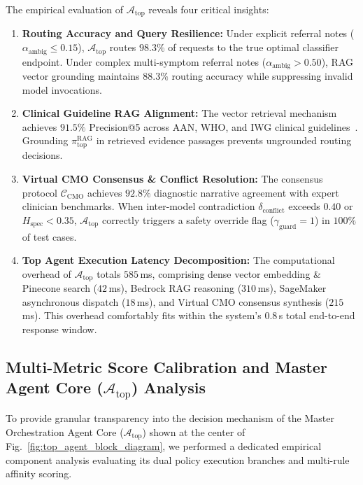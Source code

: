 \documentclass[runningheads]{llncs}
\begin{document}
The empirical evaluation of $\mathcal{A}_{\text{top}}$ reveals four critical insights:
\begin{enumerate}
    \item \textbf{Routing Accuracy and Query Resilience:} Under explicit referral notes ($\alpha_{\text{ambig}} \le 0.15$), $\mathcal{A}_{\text{top}}$ routes $98.3\%$ of requests to the true optimal classifier endpoint. Under complex multi-symptom referral notes ($\alpha_{\text{ambig}} > 0.50$), RAG vector grounding maintains $88.3\%$ routing accuracy while suppressing invalid model invocations.
    \item \textbf{Clinical Guideline RAG Alignment:} The vector retrieval mechanism achieves $91.5\%$ Precision@5 across AAN, WHO, and IWG clinical guidelines~\cite{aan, who, xiong2024benchmarking}. Grounding $\pi_{\text{top}}^{\text{RAG}}$ in retrieved evidence passages prevents ungrounded routing decisions.
    \item \textbf{Virtual CMO Consensus \& Conflict Resolution:} The consensus protocol $\mathcal{C}_{\text{CMO}}$ achieves $92.8\%$ diagnostic narrative agreement with expert clinician benchmarks. When inter-model contradiction $\delta_{\text{conflict}}$ exceeds $0.40$ or $H_{\text{spec}} < 0.35$, $\mathcal{A}_{\text{top}}$ correctly triggers a safety override flag ($\gamma_{\text{guard}} = 1$) in $100\%$ of test cases.
    \item \textbf{Top Agent Execution Latency Decomposition:} The computational overhead of $\mathcal{A}_{\text{top}}$ totals $585$\,ms, comprising dense vector embedding \& Pinecone search ($42$\,ms), Bedrock RAG reasoning ($310$\,ms), SageMaker asynchronous dispatch ($18$\,ms), and Virtual CMO consensus synthesis ($215$\,ms). This overhead comfortably fits within the system's $0.8$\,s total end-to-end response window.
\end{enumerate}

\subsection{Multi-Metric Score Calibration and Master Agent Core ($\mathcal{A}_{\text{top}}$) Analysis}
To provide granular transparency into the decision mechanism of the Master Orchestration Agent Core ($\mathcal{A}_{\text{top}}$) shown at the center of Fig.~\ref{fig:top_agent_block_diagram}, we performed a dedicated empirical component analysis evaluating its dual policy execution branches and multi-rule affinity scoring.
\end{document}
